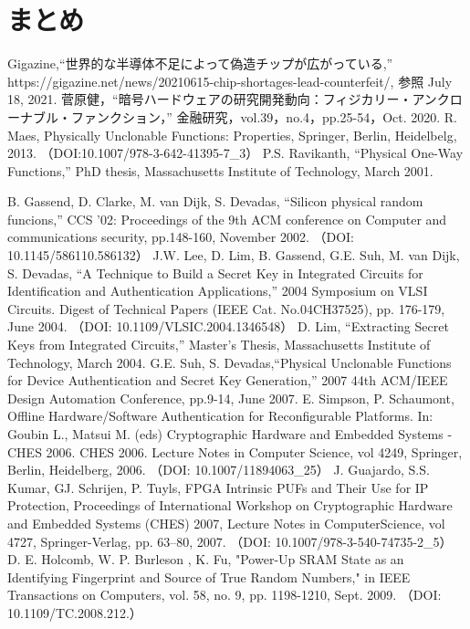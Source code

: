 \documentclass[technicalreport]{ieicej} %
\begin{document}
\section{まとめ}


%
%
\begin{thebibliography}{99}%
  Gigazine,“世界的な半導体不足によって偽造チップが広がっている,”
  https://gigazine.net/news/20210615-chip-shortages-lead-counterfeit/,
  参照 July 18, 2021.
  菅原健，“暗号ハードウェアの研究開発動向：フィジカリー・アンクローナブル・ファンクション，”
  金融研究，vol.39，no.4，pp.25-54，Oct. 2020.
  R. Maes, Physically Unclonable Functions: Properties, Springer, Berlin, Heidelbelg, 2013.
  （DOI:10.1007/978-3-642-41395-7\_3）
  P.S. Ravikanth, “Physical One-Way Functions,” PhD thesis,
  Massachusetts Institute of Technology, March 2001.

  B. Gassend, D. Clarke, M. van Dijk, S. Devadas, “Silicon physical random funcions,”
  CCS '02: Proceedings of the 9th ACM conference on Computer and communications security,
  pp.148-160, November 2002. （DOI: 10.1145/586110.586132）
  J.W. Lee, D. Lim, B. Gassend, G.E. Suh, M. van Dijk, S. Devadas,
  “A Technique to Build a Secret Key in Integrated Circuits for Identification and Authentication Applications,”
  2004 Symposium on VLSI Circuits. Digest of Technical Papers (IEEE Cat. No.04CH37525),
  pp. 176-179, June 2004. （DOI: 10.1109/VLSIC.2004.1346548）
  D. Lim, “Extracting Secret Keys from Integrated Circuits,” Master's Thesis,
  Massachusetts Institute of Technology, March 2004.
  G.E. Suh, S. Devadas,“Physical Unclonable Functions for Device Authentication and Secret Key Generation,”
  2007 44th ACM/IEEE Design Automation Conference, pp.9-14, June 2007.
  E. Simpson, P. Schaumont, Offline Hardware/Software Authentication for Reconfigurable Platforms.
  In: Goubin L., Matsui M. (eds) Cryptographic Hardware and Embedded Systems - CHES 2006.
  CHES 2006. Lecture Notes in Computer Science, vol 4249, Springer, Berlin, Heidelberg, 2006.
  （DOI: 10.1007/11894063\_25）
  J. Guajardo, S.S. Kumar, GJ. Schrijen, P. Tuyls, FPGA Intrinsic PUFs and Their Use for IP Protection,
  Proceedings of International Workshop on Cryptographic Hardware and Embedded Systems (CHES) 2007,
  Lecture Notes in ComputerScience, vol 4727, Springer-Verlag, pp. 63–80, 2007.
  （DOI: 10.1007/978-3-540-74735-2\_5）
  D. E. Holcomb, W. P. Burleson , K. Fu,
  "Power-Up SRAM State as an Identifying Fingerprint and Source of True Random Numbers,"
  in IEEE Transactions on Computers, vol. 58, no. 9, pp. 1198-1210, Sept. 2009.
  （DOI: 10.1109/TC.2008.212.）


\end{thebibliography}
\end{document}
